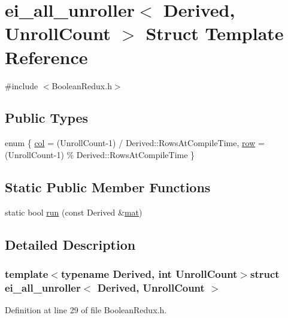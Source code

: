 \hypertarget{structei__all__unroller}{\section{ei\-\_\-all\-\_\-unroller$<$ Derived, Unroll\-Count $>$ Struct Template Reference}
\label{structei__all__unroller}
}


{\ttfamily \#include $<$Boolean\-Redux.\-h$>$}

\subsection*{Public Types}
\begin{DoxyCompactItemize}
\item 
enum \{ \hyperlink{structei__all__unroller_a13d76130f2a15cdb3fbe3a08b5325dd9ac7475f63781e8458b345dde043c29e72}{col} = (Unroll\-Count-\/1) / Derived\-:\-:Rows\-At\-Compile\-Time, 
\hyperlink{structei__all__unroller_a13d76130f2a15cdb3fbe3a08b5325dd9ae07c3bfafec5c5be8b25b1efaaae5b61}{row} = (Unroll\-Count-\/1) \% Derived\-:\-:Rows\-At\-Compile\-Time
 \}
\end{DoxyCompactItemize}
\subsection*{Static Public Member Functions}
\begin{DoxyCompactItemize}
\item 
static bool \hyperlink{structei__all__unroller_a7b102a61c0f9d57115f87b0359335e89}{run} (const Derived \&\hyperlink{uavobjecttemplate_8m_a16a51e808b16c46bbfd36da2e37cd123}{mat})
\end{DoxyCompactItemize}


\subsection{Detailed Description}
\subsubsection*{template$<$typename Derived, int Unroll\-Count$>$struct ei\-\_\-all\-\_\-unroller$<$ Derived, Unroll\-Count $>$}



Definition at line 29 of file Boolean\-Redux.\-h.



